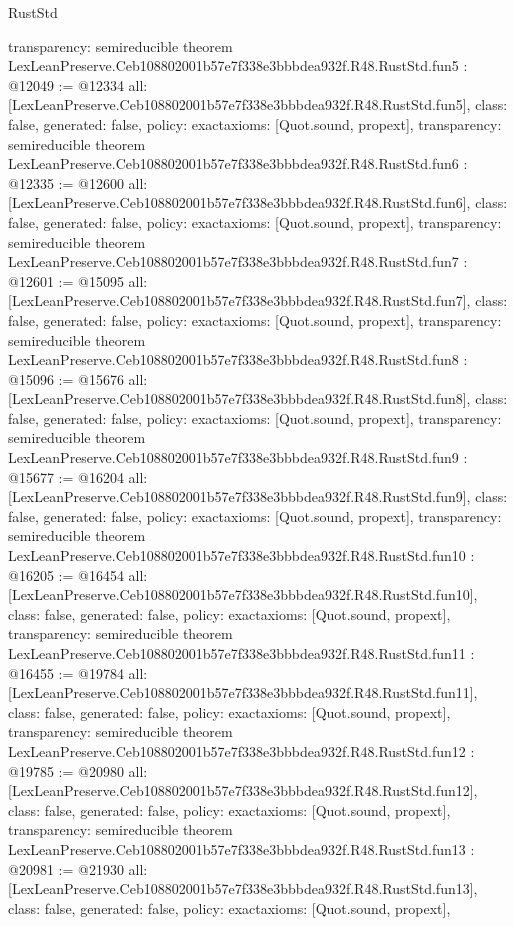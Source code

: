 \begin{lexlean}{RustStd}
\begin{coremodule}
{  transparency: semireducible
}
theorem LexLeanPreserve.Ceb108802001b57e7f338e3bbbdea932f.R48.RustStd.fun5 : @12049 := @12334 {
  all: [LexLeanPreserve.Ceb108802001b57e7f338e3bbbdea932f.R48.RustStd.fun5],
  class: false,
  generated: false,
  policy: exact{axioms: [Quot.sound, propext]},
  transparency: semireducible
}
theorem LexLeanPreserve.Ceb108802001b57e7f338e3bbbdea932f.R48.RustStd.fun6 : @12335 := @12600 {
  all: [LexLeanPreserve.Ceb108802001b57e7f338e3bbbdea932f.R48.RustStd.fun6],
  class: false,
  generated: false,
  policy: exact{axioms: [Quot.sound, propext]},
  transparency: semireducible
}
theorem LexLeanPreserve.Ceb108802001b57e7f338e3bbbdea932f.R48.RustStd.fun7 : @12601 := @15095 {
  all: [LexLeanPreserve.Ceb108802001b57e7f338e3bbbdea932f.R48.RustStd.fun7],
  class: false,
  generated: false,
  policy: exact{axioms: [Quot.sound, propext]},
  transparency: semireducible
}
theorem LexLeanPreserve.Ceb108802001b57e7f338e3bbbdea932f.R48.RustStd.fun8 : @15096 := @15676 {
  all: [LexLeanPreserve.Ceb108802001b57e7f338e3bbbdea932f.R48.RustStd.fun8],
  class: false,
  generated: false,
  policy: exact{axioms: [Quot.sound, propext]},
  transparency: semireducible
}
theorem LexLeanPreserve.Ceb108802001b57e7f338e3bbbdea932f.R48.RustStd.fun9 : @15677 := @16204 {
  all: [LexLeanPreserve.Ceb108802001b57e7f338e3bbbdea932f.R48.RustStd.fun9],
  class: false,
  generated: false,
  policy: exact{axioms: [Quot.sound, propext]},
  transparency: semireducible
}
theorem LexLeanPreserve.Ceb108802001b57e7f338e3bbbdea932f.R48.RustStd.fun10 : @16205 := @16454 {
  all: [LexLeanPreserve.Ceb108802001b57e7f338e3bbbdea932f.R48.RustStd.fun10],
  class: false,
  generated: false,
  policy: exact{axioms: [Quot.sound, propext]},
  transparency: semireducible
}
theorem LexLeanPreserve.Ceb108802001b57e7f338e3bbbdea932f.R48.RustStd.fun11 : @16455 := @19784 {
  all: [LexLeanPreserve.Ceb108802001b57e7f338e3bbbdea932f.R48.RustStd.fun11],
  class: false,
  generated: false,
  policy: exact{axioms: [Quot.sound, propext]},
  transparency: semireducible
}
theorem LexLeanPreserve.Ceb108802001b57e7f338e3bbbdea932f.R48.RustStd.fun12 : @19785 := @20980 {
  all: [LexLeanPreserve.Ceb108802001b57e7f338e3bbbdea932f.R48.RustStd.fun12],
  class: false,
  generated: false,
  policy: exact{axioms: [Quot.sound, propext]},
  transparency: semireducible
}
theorem LexLeanPreserve.Ceb108802001b57e7f338e3bbbdea932f.R48.RustStd.fun13 : @20981 := @21930 {
  all: [LexLeanPreserve.Ceb108802001b57e7f338e3bbbdea932f.R48.RustStd.fun13],
  class: false,
  generated: false,
  policy: exact{axioms: [Quot.sound, propext]},
}
\end{coremodule}
\end{lexlean}

